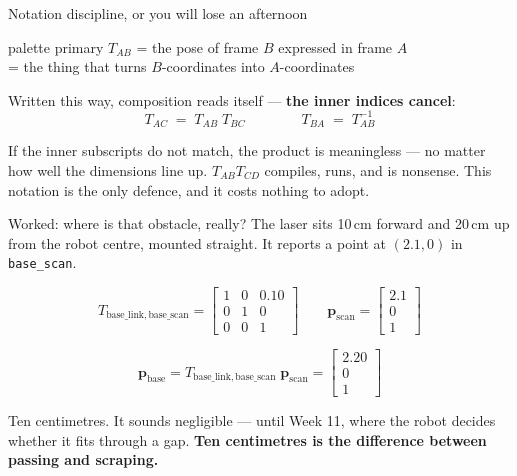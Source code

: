 \documentclass[aspectratio=169]{beamer}
\begin{document}
\begin{frame}{Notation discipline, or you will lose an afternoon}
  \begin{beamercolorbox}[sep=8pt,center,rounded=true]{palette primary}
    $T_{AB}$ \;=\; the pose of frame $B$ expressed in frame $A$\\
    \;=\; the thing that turns $B$-coordinates into $A$-coordinates
  \end{beamercolorbox}

  \vspace{0.8em}
  \small
  Written this way, composition reads itself --- \textbf{the inner indices cancel}:
  \[ T_{AC} \;=\; T_{AB}\;T_{BC}
     \qquad\qquad
     T_{BA} \;=\; T_{AB}^{-1} \]

  \vspace{0.7em}
  \begin{underhood}
    \footnotesize
    If the inner subscripts do not match, the product is meaningless --- no matter how well the
    dimensions line up. $T_{AB}T_{CD}$ compiles, runs, and is nonsense. This notation is the
    only defence, and it costs nothing to adopt.
  \end{underhood}
\end{frame}

\begin{frame}{Worked: where is that obstacle, really?}
  \small
  The laser sits 10\,cm forward and 20\,cm up from the robot centre, mounted straight.
  It reports a point at $(2.1, 0)$ in \texttt{base\_scan}.

  \vspace{0.5em}
  \[
    T_{\text{base\_link},\,\text{base\_scan}}
    = \begin{bmatrix} 1 & 0 & 0.10 \\ 0 & 1 & 0 \\ 0 & 0 & 1 \end{bmatrix}
    \qquad
    \mathbf{p}_{\text{scan}} = \begin{bmatrix} 2.1 \\ 0 \\ 1 \end{bmatrix}
  \]

  \vspace{0.3em}
  \[
    \mathbf{p}_{\text{base}} = T_{\text{base\_link},\,\text{base\_scan}}\;\mathbf{p}_{\text{scan}}
      = \begin{bmatrix} 2.20 \\ 0 \\ 1 \end{bmatrix}
  \]

  \vspace{0.4em}
  \footnotesize
  Ten centimetres. It sounds negligible --- until Week 11, where the robot decides whether it
  fits through a gap. \textbf{Ten centimetres is the difference between passing and scraping.}
\end{frame}
\end{document}
